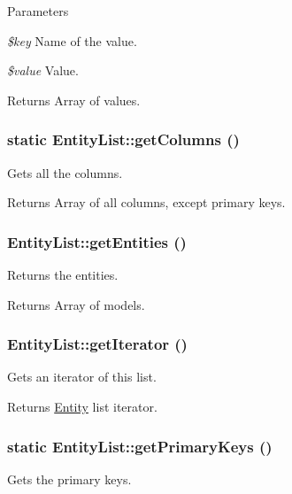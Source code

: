 \begin{DoxyParams}{Parameters}
\item[{\em \$key}]Name of the value. \item[{\em \$value}]Value.\end{DoxyParams}
\begin{DoxyReturn}{Returns}
Array of values. 
\end{DoxyReturn}
\hypertarget{classEntityList_a3a33fe428c0ff87a7555b5082aa8925a}{
\subsubsection[{getColumns}]{\setlength{\rightskip}{0pt plus 5cm}static EntityList::getColumns ()}}
\label{classEntityList_a3a33fe428c0ff87a7555b5082aa8925a}
Gets all the columns.

\begin{DoxyReturn}{Returns}
Array of all columns, except primary keys. 
\end{DoxyReturn}
\hypertarget{classEntityList_a9d5a500eeea0e7e7014e65f06e6b15f7}{
\subsubsection[{getEntities}]{\setlength{\rightskip}{0pt plus 5cm}EntityList::getEntities ()}}
\label{classEntityList_a9d5a500eeea0e7e7014e65f06e6b15f7}
Returns the entities.

\begin{DoxyReturn}{Returns}
Array of models. 
\end{DoxyReturn}
\hypertarget{classEntityList_a2320391f82acdb29e4b68efd47081b62}{
\subsubsection[{getIterator}]{\setlength{\rightskip}{0pt plus 5cm}EntityList::getIterator ()}}
\label{classEntityList_a2320391f82acdb29e4b68efd47081b62}
Gets an iterator of this list.

\begin{DoxyReturn}{Returns}
\hyperlink{classEntity}{Entity} list iterator. 
\end{DoxyReturn}
\hypertarget{classEntityList_adfac42710bce4db5b10cbd3ae4ec7714}{
\subsubsection[{getPrimaryKeys}]{\setlength{\rightskip}{0pt plus 5cm}static EntityList::getPrimaryKeys ()}}
\label{classEntityList_adfac42710bce4db5b10cbd3ae4ec7714}
Gets the primary keys.

